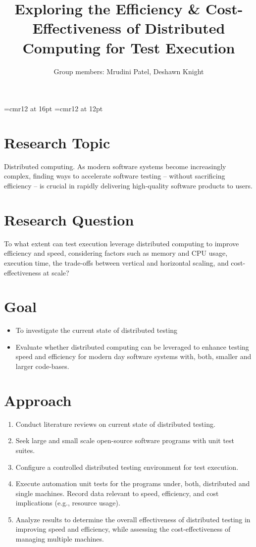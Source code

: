 \documentclass[12pt]{article}
\begin{document}
\font\titleFont=cmr12 at 16pt
\font\authorFont=cmr12 at 12pt
\title{\titleFont Exploring the Efficiency \& Cost-Effectiveness of Distributed Computing for Test Execution}
\author{\authorFont Group members: Mrudini Patel, Deshawn Knight}
\date{}

\maketitle
\section*{Research Topic}
Distributed computing. As modern software systems become increasingly complex, finding ways to accelerate software testing – without sacrificing efficiency – is crucial in rapidly delivering high-quality software products to users. 

\section*{Research Question}
To what extent can test execution leverage distributed computing to improve efficiency and speed, considering factors such as memory and CPU usage, execution time, the trade-offs between vertical and horizontal scaling, and cost-effectiveness at scale? 

\section*{Goal}
\begin{itemize}
\item To investigate the current state of distributed testing
\item Evaluate whether distributed computing can be leveraged to enhance testing speed and efficiency for modern day software systems with, both, smaller and larger code-bases.
\end{itemize}

\section*{Approach}
\begin{enumerate}
\item Conduct literature reviews on current state of distributed testing. 
\item Seek large and small scale open-source software programs with unit test suites.
\item Configure a controlled distributed testing environment for test execution.
\item Execute automation unit tests for the programs under, both, distributed and single machines. Record data relevant to speed, efficiency, and cost implications (e.g., resource usage). 
\item Analyze results to determine the overall effectiveness of distributed testing in improving speed and efficiency, while assessing the cost-effectiveness of managing multiple machines. 
\end{enumerate}
\end{document}
